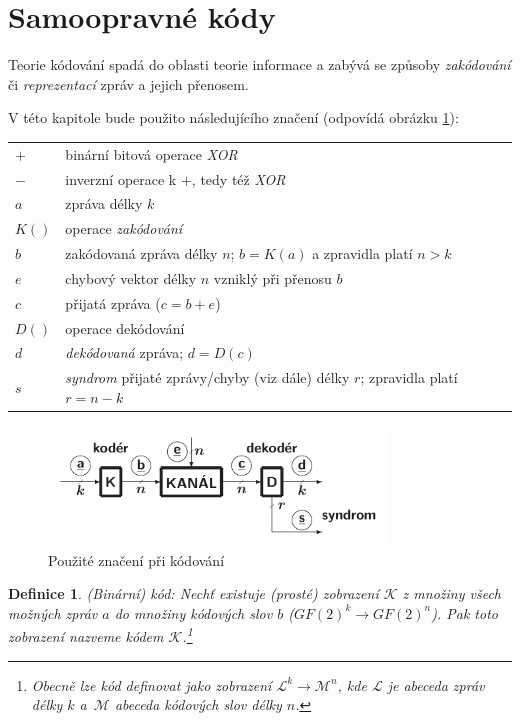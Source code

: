 \documentclass[thesis=M,czech,hidelinks]{FITthesis}[2012/06/26]
\newcommand{\0}{{\textcolor[gray]{0.80}{0}}}
\newtheorem{definice}{Definice}
\begin{document}
\section{Samoopravné kódy}

Teorie kódování spadá do oblasti teorie informace a zabývá se způsoby
\emph{zakódování} či \emph{reprezentací} zpráv a jejich přenosem.

V této kapitole bude použito následujícího značení (odpovídá obrázku
\ref{obr_kodovani}):

\begin{center}
\begin{tabular}{l p{10cm}}
    $+$     &   binární bitová operace \emph{XOR} \\
    $-$     &   inverzní operace k $+$, tedy též \emph{XOR} \\
    $a$     &   zpráva délky $k$ \\
    $K()$   &   operace \emph{zakódování} \\
    $b$     &   zakódovaná zpráva délky $n$; $b=K(a)$ a zpravidla platí $n>k$ \\
    $e$     &   chybový vektor délky $n$ vzniklý při přenosu $b$ \\
    $c$     &   přijatá zpráva ($c=b+e$) \\
    $D()$   &   operace dekódování \\
    $d$     &   \emph{dekódovaná} zpráva; $d=D(c)$ \\
    $s$     &   \emph{syndrom} přijaté zprávy/chyby (viz dále) délky $r$;
                zpravidla platí $r=n-k$ \\
\end{tabular}
\end{center}

\begin{figure}
    \centering
    \includegraphics[width=0.8\textwidth]{materialy/aak-kodovani.png}
    \caption{Použité značení při kódování~\cite{FIT_AAK}}
    \label{obr_kodovani}
\end{figure}


\begin{definice}{(Binární) kód:}
    Nechť existuje (prosté) zobrazení $\mathcal{K}$ z množiny všech možných
    zpráv $a$ do množiny kódových slov $b$ ($GF(2)^k \rightarrow GF(2)^n$). Pak
    toto zobrazení nazveme kódem $\mathcal{K}$.\footnote{
        Obecně lze \emph{kód} definovat jako zobrazení $\mathcal{L}^k
        \rightarrow \mathcal{M}^n$, kde $\mathcal{L}$ je \emph{abeceda} zpráv
        délky $k$ a~$\mathcal{M}$ abeceda kódových slov délky $n$.
    }
\end{definice}
\end{document}
